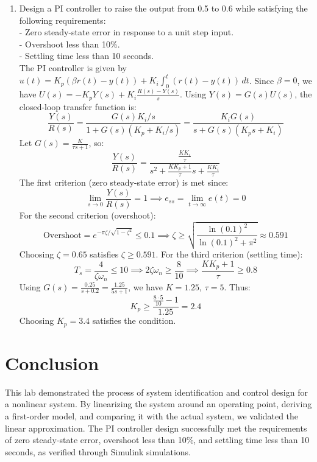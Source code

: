 \documentclass{article}
\begin{document}
\begin{enumerate}
  \item Design a PI controller to raise the output from 0.5 to 0.6 while satisfying the following requirements: \\
  - Zero steady-state error in response to a unit step input. \\
  - Overshoot less than 10\%. \\
  - Settling time less than 10 seconds. \\
  The PI controller is given by $u(t) = K_p (\beta r(t) - y(t)) + K_i \int_{0}^{t} (r(t) - y(t)) \, dt$. Since $\beta=0$, we have $U(s) = -K_p Y(s) + K_i \frac{R(s)-Y(s)}{s}$. Using $Y(s) = G(s)U(s)$, the closed-loop transfer function is:
  \begin{equation*}
    \frac{Y(s)}{R(s)} = \frac{G(s) K_i / s}{1 + G(s) (K_p + K_i / s)} = \frac{K_i G(s)}{s + G(s) (K_p s + K_i)}
  \end{equation*}
  Let $G(s) = \frac{K}{\tau s + 1}$, so:
  \begin{equation*}
    \frac{Y(s)}{R(s)} = \frac{\frac{K K_i}{\tau}}{s^2 + \frac{K K_p + 1}{\tau} s + \frac{K K_i}{\tau}}
  \end{equation*}
  The first criterion (zero steady-state error) is met since:
  \begin{equation*}
    \lim_{s \to 0} \frac{Y(s)}{R(s)} = 1 \implies e_{ss} = \lim_{t \to \infty} e(t) = 0
  \end{equation*}
  For the second criterion (overshoot):
  \begin{equation*}
    \text{Overshoot} = e^{-\pi \zeta / \sqrt{1-\zeta^2}} \leq 0.1 \implies \zeta \geq \sqrt{\frac{\ln(0.1)^2}{\ln(0.1)^2 + \pi^2}} \approx 0.591
  \end{equation*}
  Choosing $\zeta = 0.65$ satisfies $\zeta \geq 0.591$. For the third criterion (settling time):
  \begin{equation*}
    T_s = \frac{4}{\zeta \omega_n} \leq 10 \implies 2 \zeta \omega_n \geq \frac{8}{10} \implies \frac{K K_p + 1}{\tau} \geq 0.8
  \end{equation*}
  Using $G(s) = \frac{0.25}{s + 0.2} = \frac{1.25}{5s + 1}$, we have $K = 1.25$, $\tau = 5$. Thus:
  \begin{equation*}
    K_p \geq \frac{\frac{8 \cdot 5}{10} - 1}{1.25} = 2.4
  \end{equation*}
  Choosing $K_p = 3.4$ satisfies the condition.
\end{enumerate}

\section*{Conclusion}
This lab demonstrated the process of system identification and control design for a nonlinear system. By linearizing the system around an operating point, deriving a first-order model, and comparing it with the actual system, we validated the linear approximation. The PI controller design successfully met the requirements of zero steady-state error, overshoot less than 10\%, and settling time less than 10 seconds, as verified through Simulink simulations.
\end{document}
